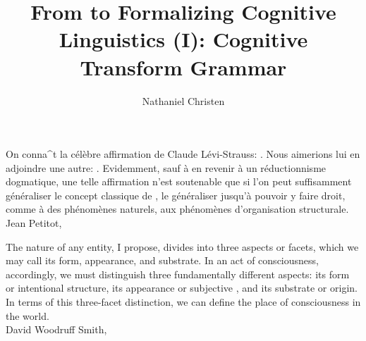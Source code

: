 \documentclass[11pt,twocolumn]{article}
\begin{document}
\title{From  to 
Formalizing Cognitive Linguistics (I): Cognitive Transform Grammar}
\author{Nathaniel Christen}
\newsavebox{\qboxi}
\newsavebox{\qboxii}
\begin{lrbox}{\qboxi}
\begin{frquote}On conna\^{\OldI}t la c\'{e}l\`{e}bre affirmation de Claude L\'{e}vi-Strauss: 
.  Nous aimerions lui en
adjoindre une autre: . 
Evidemment, sauf \`{a} en revenir \`{a} un r\'{e}ductionnisme dogmatique, une telle
affirmation n'est soutenable que si l'on peut suffisamment g\'{e}n\'{e}raliser le concept
classique de , le g\'{e}n\'{e}raliser jusqu'\`{a} pouvoir y faire droit, 
comme \`{a} des ph\'{e}nom\`{e}nes naturels, aux ph\'{e}nom\`{e}nes d'organisation structurale.
\\ \longdash{} Jean Petitot, \cite[p. 1]{PetitotSyntaxe}
\end{frquote}
\end{lrbox}	
\begin{lrbox}{\qboxii}
\begin{frquote}The nature of any entity, I propose, divides into three aspects or facets, which we may call its
	form, appearance, and substrate.  In an act of consciousness, accordingly, we must distinguish
	three fundamentally different aspects: its form or intentional structure, its appearance or
	subjective , and its substrate or origin.  In terms of this three-facet distinction, 
	we can define the place of consciousness in the world.
\\ \longdash{} David Woodruff Smith, \cite[p. 11]{DavidWoodruffSmith}
\end{frquote}
\end{lrbox}	
\twocolumn[\begin{@twocolumnfalse}
\maketitle{}
\begin{abstract}\end{abstract}
\begin{flushright}\usebox{\qboxi}
\usebox{\qboxii}
\end{flushright}
\decoline{}
\vspace{3em}
\end{@twocolumnfalse}]







\end{document}
